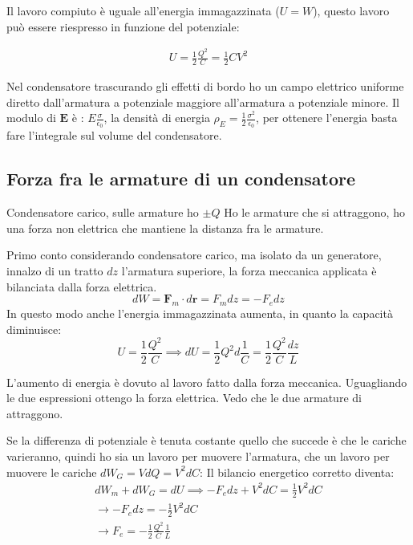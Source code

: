 \documentclass[a4paper]{scrarticle}
\begin{document}
Il lavoro compiuto è uguale all'energia immagazzinata ($U  = W$), questo lavoro può essere riespresso in funzione del potenziale:

\begin{gather*}
    U = \frac{1}{2} \frac{Q^2}{C} = \frac{1}{2} CV^2
\end{gather*}

Nel condensatore trascurando gli effetti di bordo ho un campo elettrico uniforme diretto dall'armatura a potenziale maggiore all'armatura a potenziale minore.
Il modulo di $\bm E$ è : $E \frac{\sigma}{\epsilon_0}$, la densità di energia $\rho_E = \frac{1}{2}\frac{\sigma^2}{\epsilon_0}$, per ottenere l'energia basta fare l'integrale sul volume del condensatore.

\subsection{Forza fra le armature di un condensatore}

Condensatore carico, sulle armature ho $\pm Q$
Ho le armature che si attraggono, ho una forza non elettrica che mantiene la distanza fra le armature.

Primo conto considerando condensatore carico, ma isolato da un generatore, innalzo di un tratto $dz$ l'armatura superiore, la forza meccanica applicata è bilanciata dalla forza elettrica.
\begin{equation*}
    dW = \bm F_m \cdot d\bm r = F_m dz = - F_e dz
\end{equation*}
In questo modo anche l'energia immagazzinata aumenta, in quanto la capacità diminuisce:
\begin{equation*}
    U = \frac{1}{2}\frac{Q^2}{C} \implies dU = \frac{1}{2}Q^2 d \frac{1}{C} = \frac{1}{2}\frac{Q^2}{C}\frac{dz}{L}
\end{equation*}

L'aumento di energia è dovuto al lavoro fatto dalla forza meccanica. Uguagliando le due espressioni ottengo la forza elettrica.
Vedo che le due armature di attraggono.

Se la differenza di potenziale è tenuta costante quello che succede è che le cariche varieranno, quindi ho sia un lavoro per muovere l'armatura, che un lavoro per muovere le cariche $dW_G = VdQ = V^2 dC$:
Il bilancio energetico corretto diventa:
\begin{gather*}
    dW_m + dW_G = dU \implies -F_edz + V^2dC = \frac{1}{2}V^2dC\\
    \to -F_e dz = -\frac{1}{2}V^2dC\\
    \to F_e = -\frac{1}{2}\frac{Q^2}{C}\frac{1}{L}
\end{gather*}
\end{document}
